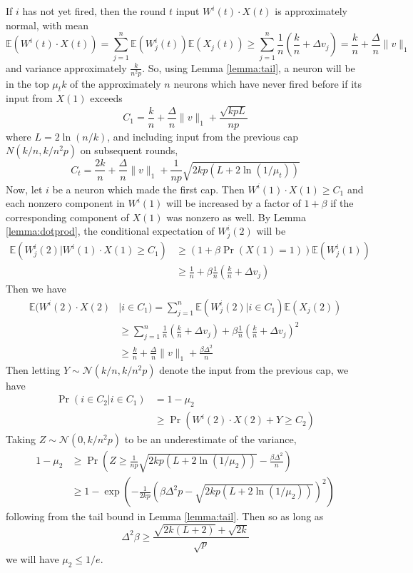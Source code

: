 \documentclass[final,12pt]{colt2022} %
\newcommand{\E}{\mathbb{E}}
\begin{document}
If $i$ has not yet fired, then the round $t$ input $W^i(t) \cdot X(t)$ is approximately normal, with mean \[\E(W^i(t) \cdot X(t)) = \sum_{j=1}^n \E(W_j^i(t)) \E(X_j(t)) \ge \sum_{j=1}^n \frac{1}{n} \left(\frac{k}{n} + \Delta v_j\right) = \frac{k}{n} + \frac{\Delta}{n} \|v\|_1\]
and variance approximately $\frac{k}{n^2p}$. So, using Lemma \ref{lemma:tail}, a neuron will be in the top $\mu_t k$ of the approximately $n$ neurons which have never fired before if its input from $X(1)$ exceeds 
\[C_1 = \frac{k}{n} + \frac{\Delta}{n} \|v\|_1 + \frac{\sqrt{kpL}}{np}\] 
where $L = 2\ln(n/k)$, and including input from the previous cap $N(k/n, k/n^2p)$ on subsequent rounds,
\[C_t = \frac{2k}{n} + \frac{\Delta}{n} \|v\|_1 + \frac{1}{np}\sqrt{2kp(L + 2\ln(1/\mu_t))}\]
Now, let $i$ be a neuron which made the first cap. Then $W^i(1) \cdot X(1) \ge C_1$ and each nonzero component in $W^i(1)$ will be increased by a factor of $1+\beta$ if the corresponding component of $X(1)$ was nonzero as well. By Lemma \ref{lemma:dotprod}, the conditional expectation of $W_j^i(2)$ will be 
\begin{align*}
    \E(W_j^i(2) \vert W^i(1) \cdot X(1) \ge C_1) &\ge \left(1 + \beta \Pr(X(1)=1)\right) \E(W_j^i(1))\\
    &\ge \frac{1}{n} + \beta \frac{1}{n}\left(\frac{k}{n} + \Delta v_j\right)
\end{align*}
Then we have \begin{align*}
    \E(W^i(2) \cdot X(2) &\vert i \in C_1) = \sum_{j=1}^n \E(W_j^i(2) \vert i \in C_1) \E(X_j(2))\\
    &\ge \sum_{j=1}^n \frac{1}{n}\left(\frac{k}{n} + \Delta v_j\right) + \beta \frac{1}{n}\left(\frac{k}{n} + \Delta v_j\right)^2\\
    &\ge \frac{k}{n} + \frac{\Delta}{n}\|v\|_1 + \frac{\beta\Delta^2}{n}
\end{align*}
Then letting $Y \sim \mathcal N(k/n, k/n^2p)$ denote the input from the previous cap, we have \begin{align*}
    \Pr(i \in C_2 \vert i \in C_1) &= 1 - \mu_2\\
    &\ge \Pr(W^i(2) \cdot X(2) + Y \ge C_2)
\end{align*} Taking $Z \sim \mathcal N(0, k/n^2p)$ to be an underestimate of the variance, \begin{align*}
    1 - \mu_2 &\ge \Pr\left(Z \ge \frac{1}{np}\sqrt{2kp(L + 2\ln(1/\mu_2))} - \frac{\beta\Delta^2}{n}\right)\\
    &\ge 1 - \exp\left(-\frac{1}{2kp}\left(\beta\Delta^2p - \sqrt{2kp(L + 2\ln(1/\mu_2))}\right)^2\right)
\end{align*} following from the tail bound in Lemma \ref{lemma:tail}. Then so as long as 
\[ \Delta^2\beta \ge \frac{\sqrt{2k(L + 2)} + \sqrt{2k}}{\sqrt{p}} \] we will have $\mu_2 \le 1/e$.
\end{document}
